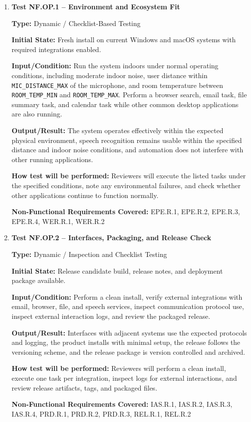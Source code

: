 \documentclass[12pt, titlepage]{article}
\begin{document}
\begin{enumerate}

\item \textbf{Test NF.OP.1 -- Environment and Ecosystem Fit}

\textbf{Type:} Dynamic / Checklist-Based Testing

\textbf{Initial State:} Fresh install on current Windows and macOS
systems with required integrations enabled.

\textbf{Input/Condition:} Run the system indoors under normal operating
conditions, including moderate indoor noise, user distance within
\texttt{MIC\_DISTANCE\_MAX} of the microphone, and room temperature
between \texttt{ROOM\_TEMP\_MIN} and \texttt{ROOM\_TEMP\_MAX}. Perform a
browser search, email task, file summary task, and calendar task while
other common desktop applications are also running.

\textbf{Output/Result:} The system operates effectively within the
expected physical environment, speech recognition remains usable within
the specified distance and indoor noise conditions, and automation does
not interfere with other running applications.

\textbf{How test will be performed:} Reviewers will execute the listed
tasks under the specified conditions, note any environmental failures,
and check whether other applications continue to function normally.

\textbf{Non-Functional Requirements Covered:} EPE.R.1, EPE.R.2,
EPE.R.3, EPE.R.4, WER.R.1, WER.R.2

\item \textbf{Test NF.OP.2 -- Interfaces, Packaging, and Release Check}

\textbf{Type:} Dynamic / Inspection and Checklist Testing

\textbf{Initial State:} Release candidate build, release notes, and
deployment package available.

\textbf{Input/Condition:} Perform a clean install, verify external
integrations with email, browser, file, and speech services, inspect
communication protocol use, inspect external interaction logs, and
review the packaged release.

\textbf{Output/Result:} Interfaces with adjacent systems use the
expected protocols and logging, the product installs with minimal setup,
the release follows the versioning scheme, and the release package is
version controlled and archived.

\textbf{How test will be performed:} Reviewers will perform a clean
install, execute one task per integration, inspect logs for external
interactions, and review release artifacts, tags, and packaged files.

\textbf{Non-Functional Requirements Covered:} IAS.R.1, IAS.R.2,
IAS.R.3, IAS.R.4, PRD.R.1, PRD.R.2, PRD.R.3, REL.R.1, REL.R.2

\end{enumerate}
\end{document}
